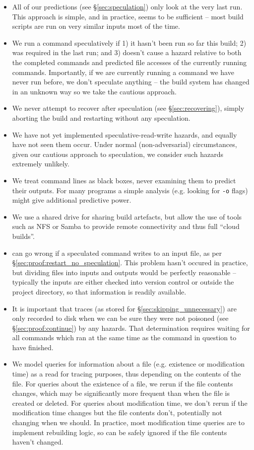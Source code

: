 \begin{itemize}
\item All of our predictions (see \S\ref{sec:speculation}) only look at the very last run. This approach is simple, and in practice, seems to be sufficient -- most build scripts are run on very similar inputs most of the time.
\item We run a command speculatively if 1) it hasn't been run so far this build; 2) was required in the last run; and 3) doesn't cause a hazard relative to both the completed commands and predicted file accesses of the currently running commands. Importantly, if we are currently running a command we have never run before, we don't speculate anything -- the build system has changed in an unknown way so we take the cautious approach.
\item We never attempt to recover after speculation (see \S\ref{sec:recovering}), simply aborting the build and restarting without any speculation.
\item We have not yet implemented speculative-read-write hazards, and equally have not seen them occur. Under normal (non-adversarial) circumstances, given our cautious approach to speculation, we consider such hazards extremely unlikely.
\item We treat command lines as black boxes, never examining them to predict their outputs. For many programs a simple analysis (e.g. looking for \texttt{-o} flags) might give additional predictive power.
\item We use a shared drive for sharing build artefacts, but allow the use of tools such as NFS or Samba to provide remote connectivity and thus full ``cloud builds''.
\item \Rattle can go wrong if a speculated command writes to an input file, as per \S\ref{sec:proof:restart_no_speculation}. This problem hasn't occured in practice, but dividing files into inputs and outputs would be perfectly reasonable -- typically the inputs are either checked into version control or outside the project directory, so that information is readily available.
\item It is important that traces (as stored for \S\ref{sec:skipping_unnecessary}) are only recorded to disk when we can be sure they were not poisoned (see \S\ref{sec:proof:continue}) by any hazards. That determination requires waiting for all commands which ran at the same time as the command in question to have finished.
\item We model queries for information about a file (e.g. existence or modification time) as a read for tracing purposes, thus depending on the contents of the file. For queries about the existence of a file, we rerun if the file contents changes, which may be significantly more frequent than when the file is created or deleted. For queries about modification time, we don't rerun if the modification time changes but the file contents don't, potentially not changing when we should. In practice, most modification time queries are to implement rebuilding logic, so can be safely ignored if the file contents haven't changed.
\end{itemize}


